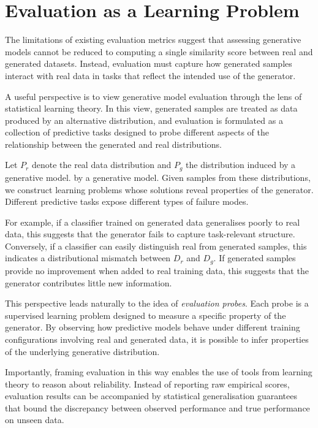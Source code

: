 \section{Evaluation as a Learning Problem}
\label{sec:rankgen:framework}

The limitations of existing evaluation metrics suggest that assessing
generative models cannot be reduced to computing a single similarity score
between real and generated datasets. Instead, evaluation must capture how
generated samples interact with real data in tasks that reflect the intended
use of the generator.

A useful perspective is to view generative model evaluation through the lens
of statistical learning theory. In this view, generated samples are treated as
data produced by an alternative distribution, and evaluation is formulated as
a collection of predictive tasks designed to probe different aspects of the
relationship between the generated and real distributions.

Let $P_r$ denote the real data distribution and $P_g$ the distribution induced
by a generative model.
by a generative model. Given samples from these distributions, we construct
learning problems whose solutions reveal properties of the generator.
Different predictive tasks expose different types of failure modes.

For example, if a classifier trained on generated data generalises poorly to
real data, this suggests that the generator fails to capture task-relevant
structure. Conversely, if a classifier can easily distinguish real from
generated samples, this indicates a distributional mismatch between $D_r$ and
$D_g$. If generated samples provide no improvement when added to real training
data, this suggests that the generator contributes little new information.

This perspective leads naturally to the idea of \emph{evaluation probes}.
Each probe is a supervised learning problem designed to measure a specific
property of the generator. By observing how predictive models behave under
different training configurations involving real and generated data, it is
possible to infer properties of the underlying generative distribution.

Importantly, framing evaluation in this way enables the use of tools from
learning theory to reason about reliability. Instead of reporting raw
empirical scores, evaluation results can be accompanied by statistical
generalisation guarantees that bound the discrepancy between observed
performance and true performance on unseen data.

